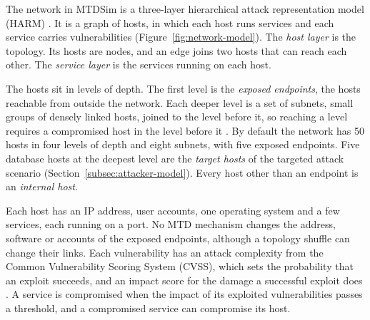 \documentclass{cshonours}
\begin{document}
The network in MTDSim is a three-layer hierarchical attack representation
model (HARM) \citep{hongkim2012harm, brown2023}. It is a graph of hosts, in which each host
runs services and each service carries vulnerabilities
(Figure~\ref{fig:network-model}). The \emph{host layer} is the topology.
Its hosts are nodes, and an edge joins two hosts that can reach each other.
The \emph{service layer} is the services running on each host.

The hosts sit in levels of depth. The first level is the \emph{exposed
endpoints}, the hosts reachable from outside the network. Each deeper level
is a set of subnets, small groups of densely linked hosts, joined to the
level before it, so reaching a level requires a compromised host in the
level before it \citep{brown2023}. By default the network has 50 hosts in
four levels of depth and eight subnets, with five exposed endpoints. Five
database hosts at the deepest level are the \emph{target hosts} of the
targeted attack scenario (Section~\ref{subsec:attacker-model}). Every host
other than an endpoint is an \emph{internal host}.

Each host has an IP address, user accounts, one operating system and a few
services, each running on a port. No MTD mechanism changes the
address, software or accounts of the exposed endpoints,
although a topology shuffle can change their links. Each vulnerability has an attack complexity from the Common
Vulnerability Scoring System (CVSS), which sets the probability that an
exploit succeeds, and an impact score for the damage a successful exploit
does \citep{brown2023}. A service is compromised when the impact of its
exploited vulnerabilities passes a threshold, and a compromised service can
compromise its host.

\end{document}
